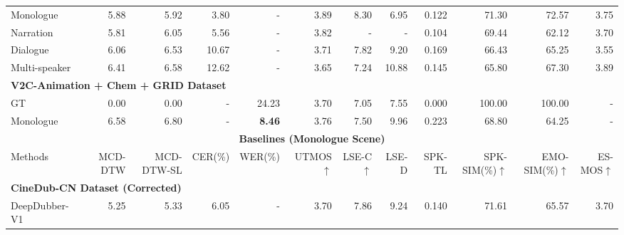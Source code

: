 \documentclass{article}
\begin{document}
\begin{table}
{\begin{tabular}{l|rrrrrrrrrrr}
        Monologue     & 5.88              & 5.92                      & 3.80                & -                     & 3.89              & 8.30              & 6.95              & 0.122                 & 71.30                 & 72.57                 & 3.75  \\
        Narration     & 5.81              & 6.05                      & 5.56                & -                     & 3.82              & -                 & -                 & 0.104                 & 69.44                 & 62.12                 & 3.70  \\
        Dialogue      & 6.06              & 6.53                      & 10.67               & -                     & 3.71              & 7.82              & 9.20              & 0.169                 & 66.43                 & 65.25                 & 3.55  \\
        Multi-speaker & 6.41              & 6.58                      & 12.62               & -                     & 3.65              & 7.24              & 10.88             & 0.145                 & 65.80                 & 67.30                 & 3.89  \\
        \midrule
        \multicolumn{12}{l}{\textbf{V2C-Animation + Chem + GRID Dataset}} \\
        \midrule
        GT            & 0.00              & 0.00                      & -                   & 24.23                 & 3.70              & 7.05              & 7.55              & 0.000                 & 100.00                & 100.00                & -  \\
        Monologue     & 6.58              & 6.80                      & -                   & \textbf{8.46}         & 3.76              & 7.50              & 9.96              & 0.223                 & 68.80                 & 64.25                 & -  \\
        \bottomrule
        \toprule
        \multicolumn{12}{c}{\textbf{Baselines (Monologue Scene)}} \\
        \midrule
        Methods                     & MCD-DTW   & MCD-DTW-SL    & CER(\%)   & WER(\%)   & UTMOS$\uparrow$   & LSE-C$\uparrow$   & LSE-D & SPK-TL    & SPK-SIM(\%)$\uparrow$ & EMO-SIM(\%)$\uparrow$ & ES-MOS$\uparrow$\\
        \midrule
        \multicolumn{12}{l}{\textbf{CineDub-CN Dataset (Corrected)}} \\
        \midrule
        DeepDubber-V1~\cite{DeepDubber-V1}  & 5.25          & 5.33                      & 6.05                  & -                     & 3.70              & 7.86              & 9.24              & 0.140                 & 71.61                 & 65.57                 & 3.70  \\

\end{tabular}}
\end{table}
\end{document}
